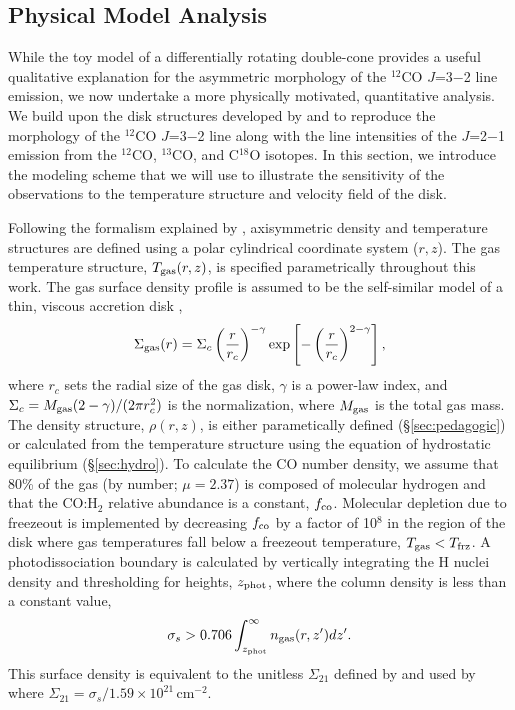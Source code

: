 \subsection{Physical Model Analysis}\label{sec:models}

While the toy model of a differentially rotating double-cone provides a useful
qualitative explanation for the asymmetric morphology of the $^{12}$CO $J$=3$-$2
line emission, we now undertake a more physically motivated, quantitative 
analysis.  We build upon the disk structures developed by \citet{dartois03} and 
\citet{qi11} to reproduce the morphology of the $^{12}$CO $J$=3$-$2 line along 
with the line intensities of the $J$=2$-$1 emission from the $^{12}$CO, 
$^{13}$CO, and C$^{18}$O isotopes.  In this section, we introduce the modeling 
scheme that we will use to illustrate the sensitivity of the observations to the
temperature structure and velocity field of the disk.

Following the formalism explained by \citet{andrews12}, axisymmetric density 
and temperature structures are defined using a polar cylindrical 
coordinate system ($r,z$).  The gas temperature structure, $T_{\rm gas}(r,z)$,
is specified parametrically throughout this work.  The gas surface density 
profile is assumed to be the self-similar model of a thin, viscous accretion 
disk 
\citep{lynden-bell74,hartmann98},
\begin{equation}
\Sigma_{\rm gas}(r) = \Sigma_c \left(\frac{r}{r_c}\right)^{-\gamma} \exp \left[-\left(\frac{r}{r_c}\right)^{2-\gamma}\right],
\end{equation}
where $r_c$ sets the radial size of the gas disk, $\gamma$ is a power-law index,
and $\Sigma_c = M_{\rm gas} (2-\gamma)/(2\pi r_c^2) $ is the normalization, 
where $M_{\rm gas}$ is the total gas mass.  The density structure, $\rho(r,z)$, 
is either parametically defined (\S\ref{sec:pedagogic}) or calculated from the 
temperature structure using the equation of hydrostatic equilibrium 
(\S\ref{sec:hydro}).  To calculate the CO number density, we assume that 80\% of
the gas (by number; $\mu = 2.37$) is composed of molecular hydrogen and that the
CO:H$_2$ relative abundance is a constant, $f_{\rm co}$.  Molecular depletion 
due to freezeout is implemented by decreasing $f_{\rm co}$ by a factor of 
10$^{8}$ in the region of the disk where gas temperatures fall below a freezeout
temperature, $T_{\rm gas} < T_{\rm frz}$.  A photodissociation boundary is 
calculated by vertically integrating the H nuclei density 
\citep[$0.706n_{\rm gas}$, the same procedure as in \citet{qi11};][]{aikawa99} and thresholding for 
heights, $z_{\rm phot}$, where the column density is less than a constant value,
\begin{equation}
\sigma_s > 0.706 \int_{z_{\rm phot}}^\infty n_{\rm gas}(r,z') dz'.
\end{equation}
This surface density is equivalent to the unitless $\Sigma_{21}$ defined by
\citet{aikawa06} and used by \citet{qi11} where 
$\Sigma_{21} = \sigma_s / 1.59 \times 10^{21}$\,cm$^{-2}$.

